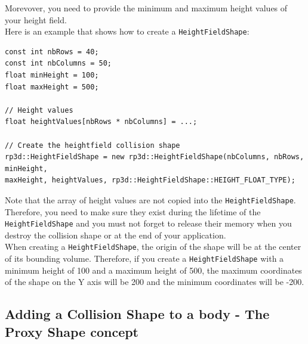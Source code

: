 \documentclass[a4paper,12pt]{article}
\begin{document}
  \vspace{0.6cm}

  Morevover, you need to provide the minimum and maximum height values of your height field. \\

  Here is an example that shows how to create a \texttt{HeightFieldShape}: \\

  \begin{lstlisting}
const int nbRows = 40;
const int nbColumns = 50;
float minHeight = 100;
float maxHeight = 500;

// Height values
float heightValues[nbRows * nbColumns] = ...;

// Create the heightfield collision shape
rp3d::HeightFieldShape = new rp3d::HeightFieldShape(nbColumns, nbRows, minHeight,
maxHeight, heightValues, rp3d::HeightFieldShape::HEIGHT_FLOAT_TYPE);
  \end{lstlisting}

  \vspace{0.6cm}

  Note that the array of height values are not copied into the \texttt{HeightFieldShape}. Therefore, you need to make sure
  they exist during the lifetime of the \texttt{HeightFieldShape} and you must not forget to release their memory when you
  destroy the collision shape or at the end of your application. \\

  When creating a \texttt{HeightFieldShape}, the origin of the shape will be at the center of its bounding volume.
  Therefore, if you create a \texttt{HeightFieldShape} with a minimum height of 100 and a maximum height of 500, the
  maximum coordinates of the shape on the Y axis will be 200 and the minimum coordinates will be -200.

    \subsection{Adding a Collision Shape to a body - The Proxy Shape concept}
\end{document}
